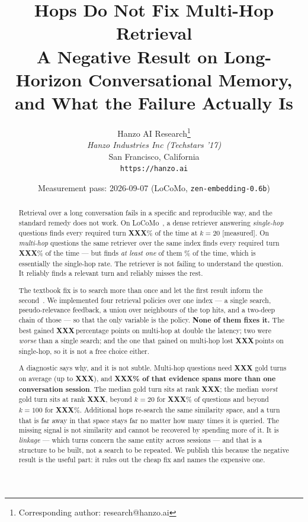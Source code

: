 \documentclass[11pt]{article}
\title{Hops Do Not Fix Multi-Hop Retrieval\\[0.3em]
{\large A Negative Result on Long-Horizon Conversational Memory,\\
and What the Failure Actually Is}}
\author{
    Hanzo AI Research\thanks{Corresponding author: research@hanzo.ai} \\
    \textit{Hanzo Industries Inc (Techstars '17)} \\
    San Francisco, California \\
    \texttt{https://hanzo.ai}
}
\date{Measurement pass: 2026-09-07 (LoCoMo, \texttt{zen-embedding-0.6b})}
\newcommand{\meas}{\textcolor{blue!60!black}{\small[measured]}}
\newcommand{\ph}{\textbf{XXX}}
\newcommand{\rSallTwenty}{\ph}  \newcommand{\rSanyFive}{\ph}
\newcommand{\rMallTwenty}{\ph}  \newcommand{\rManyFive}{\ph}
\newcommand{\rBestDelta}{\ph}   \newcommand{\rWorstDelta}{\ph}
\newcommand{\rGoldAvg}{\ph}     \newcommand{\rGoldMax}{\ph}
\newcommand{\rSpanSessions}{\ph}\newcommand{\rMedRank}{\ph}
\newcommand{\rMedWorst}{\ph}    \newcommand{\rBeyondTwenty}{\ph}
\newcommand{\rBeyondHundred}{\ph}
\begin{document}
\hanzocoverpage
\maketitle

\begin{abstract}
Retrieval over a long conversation fails in a specific and reproducible way, and
the standard remedy does not work. On LoCoMo~\cite{locomo}, a dense retriever
answering \emph{single-hop} questions finds every required turn
\rSallTwenty{}\% of the time at $k{=}20$ \meas{}. On \emph{multi-hop} questions
the same retriever over the same index finds every required turn
\rMallTwenty{}\% of the time --- but finds \emph{at least one} of them
\rManyTwenty{}\% of the time, which is essentially the single-hop rate. The
retriever is not failing to understand the question. It reliably finds a
relevant turn and reliably misses the rest.

The textbook fix is to search more than once and let the first result inform the
second~\cite{rocchio,ircot}. We implemented four retrieval policies over one
index --- a single search, pseudo-relevance feedback, a union over neighbours of
the top hits, and a two-deep chain of those --- so that the only variable is the
policy. \textbf{None of them fixes it.} The best gained
\rBestDelta{}\,percentage points on multi-hop at double the latency; two were
\emph{worse} than a single search; and the one that gained on multi-hop lost
\rWorstDelta{}\,points on single-hop, so it is not a free choice either.

A diagnostic says why, and it is not subtle. Multi-hop questions need
\rGoldAvg{} gold turns on average (up to \rGoldMax{}), and
\textbf{\rSpanSessions{}\% of that evidence spans more than one conversation
session}. The median gold turn sits at rank \rMedRank{}; the median
\emph{worst} gold turn sits at rank \rMedWorst{}, beyond $k{=}20$ for
\rBeyondTwenty{}\% of questions and beyond $k{=}100$ for
\rBeyondHundred{}\%. Additional hops re-search the same similarity space, and a
turn that is far away in that space stays far no matter how many times it is
queried. The missing signal is not similarity and cannot be recovered by
spending more of it. It is \emph{linkage} --- which turns concern the same
entity across sessions --- and that is a structure to be built, not a search to
be repeated. We publish this because the negative result is the useful part: it
rules out the cheap fix and names the expensive one.
\end{abstract}









\end{document}

